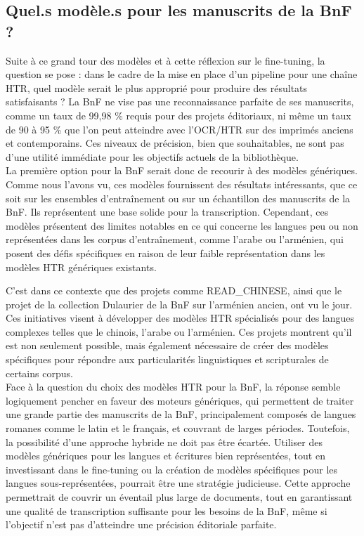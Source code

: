 \documentclass[a4paper,12pt,twoside]{book}
\begin{document}
	\subsection{Quel.s modèle.s pour les manuscrits de la BnF ?}
	
	Suite à ce grand tour des modèles et à cette réflexion sur le fine-tuning, la question se pose : dans le cadre de la mise en place d’un pipeline pour une chaîne HTR, quel modèle serait le plus approprié pour produire des résultats satisfaisants ? La BnF ne vise pas une reconnaissance parfaite de ses manuscrits, comme un taux de 99,98 \% requis pour des projets éditoriaux, ni même un taux de 90 à 95 \% que l’on peut atteindre avec l’OCR/HTR sur des imprimés anciens et contemporains. Ces niveaux de précision, bien que souhaitables, ne sont pas d’une utilité immédiate pour les objectifs actuels de la bibliothèque.
	\\
	
	La première option pour la BnF serait donc de recourir à des modèles génériques. Comme nous l’avons vu, ces modèles fournissent des résultats intéressants, que ce soit sur les ensembles d’entraînement ou sur un échantillon des manuscrits de la BnF. Ils représentent une base solide pour la transcription. Cependant, ces modèles présentent des limites notables en ce qui concerne les langues peu ou non représentées dans les corpus d’entraînement, comme l’arabe ou l’arménien, qui posent des défis spécifiques en raison de leur faible représentation dans les modèles HTR génériques existants.
	
	C’est dans ce contexte que des projets comme READ\_CHINESE, ainsi que le projet de la collection Dulaurier de la BnF sur l’arménien ancien, ont vu le jour. Ces initiatives visent à développer des modèles HTR spécialisés pour des langues complexes telles que le chinois, l’arabe ou l’arménien. Ces projets montrent qu’il est non seulement possible, mais également nécessaire de créer des modèles spécifiques pour répondre aux particularités linguistiques et scripturales de certains corpus.
	\\
	
	Face à la question du choix des modèles HTR pour la BnF, la réponse semble logiquement pencher en faveur des moteurs génériques, qui permettent de traiter une grande partie des manuscrits de la BnF, principalement composés de langues romanes comme le latin et le français, et couvrant de larges périodes. Toutefois, la possibilité d’une approche hybride ne doit pas être écartée. Utiliser des modèles génériques pour les langues et écritures bien représentées, tout en investissant dans le fine-tuning ou la création de modèles spécifiques pour les langues sous-représentées, pourrait être une stratégie judicieuse. Cette approche permettrait de couvrir un éventail plus large de documents, tout en garantissant une qualité de transcription suffisante pour les besoins de la BnF, même si l’objectif n’est pas d’atteindre une précision éditoriale parfaite.
	\\
	
\end{document}
